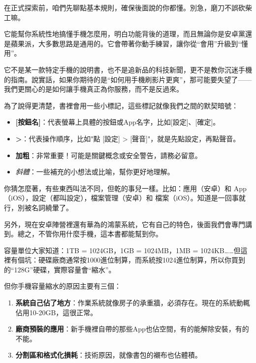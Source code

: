 
在正式探索前，咱們先聊點基本規則，確保後面說的你都懂。別急，磨刀不誤砍柴工嘛。


它能幫你系統性地搞懂手機怎麼用，明白功能背後的道理，而且無論你是安卓黨還是蘋果派，大多數思路是通用的。它會帶著你動手練習，讓你從“會用”升級到“懂用”。

它不是某一款特定手機的說明書，也不是追新品的科技新聞，更不是教你沉迷手機的指南。說實話，如果你期待的是“如何用手機刷影片更爽”，那可能要失望了——我們更關心的是如何讓手機真正為你服務，而不是反過來。


為了說得更清楚，書裡會用一些小標記，這些標記就像我們之間的默契暗號：

\begin{itemize}
  \item \textbf{[按鈕名]}：代表螢幕上具體的按鈕或App名字，比如[設定]、[確定]。
  \item \textbf{>}：代表操作順序，比如"點 [設定] > [聲音]"，就是先點設定，再點聲音。
  \item \textbf{加粗}：非常重要！可能是關鍵概念或安全警告，請務必留意。
  \item \emph{斜體}：一些補充的小想法或比喻，幫你更好地理解。
\end{itemize}


你猜怎麼著，有些東西叫法不同，但乾的事兒一樣。比如：應用（安卓）和 App（iOS），設定（都叫設定），檔案管理（安卓）和 檔案（iOS）。知道是一回事就行，別被名詞繞暈了。

另外，現在安卓陣營裡還有華為的鴻蒙系統，它有自己的特色，後面我們會專門講到。總之，不管你用什麼手機，這本書都能幫到你。


容量單位大家知道：1TB = 1024GB，1GB = 1024MB，1MB = 1024KB……但這裡有個坑：硬碟廠商通常按1000進位制算，而系統按1024進位制算，所以你買到的“128G”硬碟，實際容量會“縮水”。

但你手機容量縮水的原因主要有三個：

\begin{enumerate}
  \item \textbf{系統自己佔了地方}：作業系統就像房子的承重牆，必須存在。現在的系統動輒佔用10-20GB，這很正常。
  \item \textbf{廠商預裝的應用}：新手機裡自帶的那些App也佔空間，有的能解除安裝，有的不能。
  \item \textbf{分割區和格式化損耗}：技術原因，就像書包的襯布也佔體積。
\end{enumerate}

